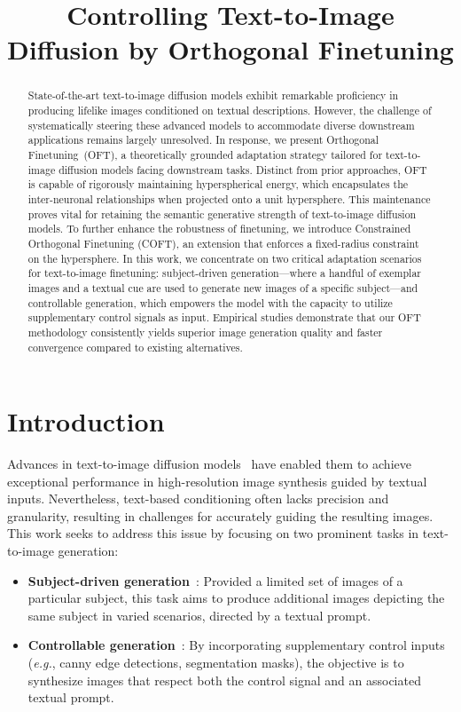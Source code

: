 \title{Controlling Text-to-Image Diffusion by Orthogonal Finetuning}

\begin{abstract}
State-of-the-art text-to-image diffusion models exhibit remarkable proficiency in producing lifelike images conditioned on textual descriptions. However, the challenge of systematically steering these advanced models to accommodate diverse downstream applications remains largely unresolved. In response, we present Orthogonal Finetuning~(OFT), a theoretically grounded adaptation strategy tailored for text-to-image diffusion models facing downstream tasks. Distinct from prior approaches, OFT is capable of rigorously maintaining hyperspherical energy, which encapsulates the inter-neuronal relationships when projected onto a unit hypersphere. This maintenance proves vital for retaining the semantic generative strength of text-to-image diffusion models. To further enhance the robustness of finetuning, we introduce Constrained Orthogonal Finetuning (COFT), an extension that enforces a fixed-radius constraint on the hypersphere. In this work, we concentrate on two critical adaptation scenarios for text-to-image finetuning: subject-driven generation—where a handful of exemplar images and a textual cue are used to generate new images of a specific subject—and controllable generation, which empowers the model with the capacity to utilize supplementary control signals as input. Empirical studies demonstrate that our OFT methodology consistently yields superior image generation quality and faster convergence compared to existing alternatives.
\end{abstract}

\section{Introduction}

Advances in text-to-image diffusion models~\cite{saharia2022photorealistic,ramesh2022hierarchical,rombach2022high} have enabled them to achieve exceptional performance in high-resolution image synthesis guided by textual inputs. Nevertheless, text-based conditioning often lacks precision and granularity, resulting in challenges for accurately guiding the resulting images. This work seeks to address this issue by focusing on two prominent tasks in text-to-image generation:

\begin{itemize}[leftmargin=*,nosep]

    \item \textbf{Subject-driven generation}~\cite{ruiz2023dreambooth}: Provided a limited set of images of a particular subject, this task aims to produce additional images depicting the same subject in varied scenarios, directed by a textual prompt.
    \item \textbf{Controllable generation}~\cite{zhang2023adding,mou2023t2i}: By incorporating supplementary control inputs (\emph{e.g.}, canny edge detections, segmentation masks), the objective is to synthesize images that respect both the control signal and an associated textual prompt.
\end{itemize}

